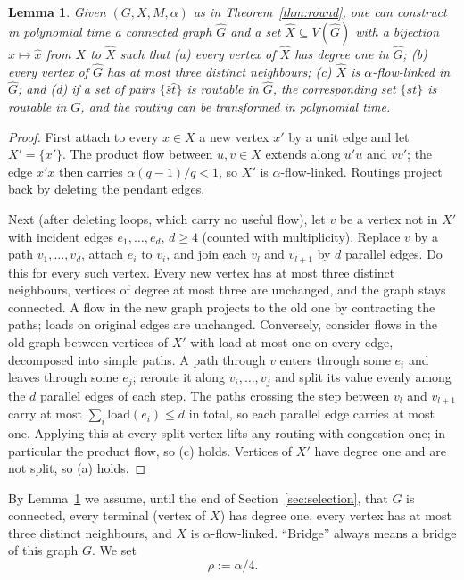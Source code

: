 \documentclass[11pt,letterpaper]{article}
\newtheorem{lemma}[theorem]{Lemma}
\theoremstyle{definition}
\newcommand{\load}{\mathrm{load}}
\begin{document}
\begin{lemma}\label{lem:reduce}
Given $(G,X,M,\alpha)$ as in Theorem~\ref{thm:round}, one can construct in polynomial time a
connected graph $\hat G$ and a set $\hat X\subseteq V(\hat G)$ with a bijection
$x\mapsto\hat x$ from $X$ to $\hat X$ such that (a) every vertex of $\hat X$ has degree one
in $\hat G$; (b) every vertex of $\hat G$ has at most three distinct neighbours; (c) $\hat X$
is $\alpha$-flow-linked in $\hat G$; and (d) if a set of pairs $\{\hat s\hat t\}$ is routable
in $\hat G$, the corresponding set $\{st\}$ is routable in $G$, and the routing can be
transformed in polynomial time.
\end{lemma}
\begin{proof}
First attach to every $x\in X$ a new vertex $x'$ by a unit edge and let $X'=\{x'\}$. The
product flow between $u,v\in X$ extends along $u'u$ and $vv'$; the edge $x'x$ then carries
$\alpha(q-1)/q<1$, so $X'$ is $\alpha$-flow-linked. Routings project back by deleting the
pendant edges.

Next (after deleting loops, which carry no useful flow), let $v$ be a vertex not in $X'$
with incident edges $e_1,\dots,e_d$, $d\ge4$ (counted with multiplicity). Replace $v$ by a path $v_1,\dots,v_d$, attach $e_i$ to $v_i$, and join each
$v_l$ and $v_{l+1}$ by $d$ parallel edges. Do this for every such vertex. Every new vertex has
at most three distinct neighbours, vertices of degree at most three are unchanged, and the
graph stays connected. A flow in the new graph projects to the old one by contracting the
paths; loads on original edges are unchanged. Conversely, consider flows in the old graph
between vertices of $X'$ with load at most one on every edge, decomposed into simple paths.
A path through $v$ enters through some $e_i$ and leaves through some $e_j$; reroute it along
$v_i,\dots,v_j$ and split its value evenly among the $d$ parallel edges of each step. The
paths crossing the step between $v_l$ and $v_{l+1}$ carry at most
$\sum_i\load(e_i)\le d$ in total, so each parallel edge carries at most one. Applying this at
every split vertex lifts any routing with congestion one; in particular the product flow,
so (c) holds. Vertices of $X'$ have degree one and are not split, so (a) holds.
\end{proof}

By Lemma~\ref{lem:reduce} we assume, until the end of Section~\ref{sec:selection}, that $G$
is connected, every terminal (vertex of $X$) has degree one, every vertex has at most three
distinct neighbours, and $X$ is $\alpha$-flow-linked. ``Bridge'' always means a bridge of
this graph $G$. We set
\[
\rho:=\alpha/4 .
\]
\end{document}
